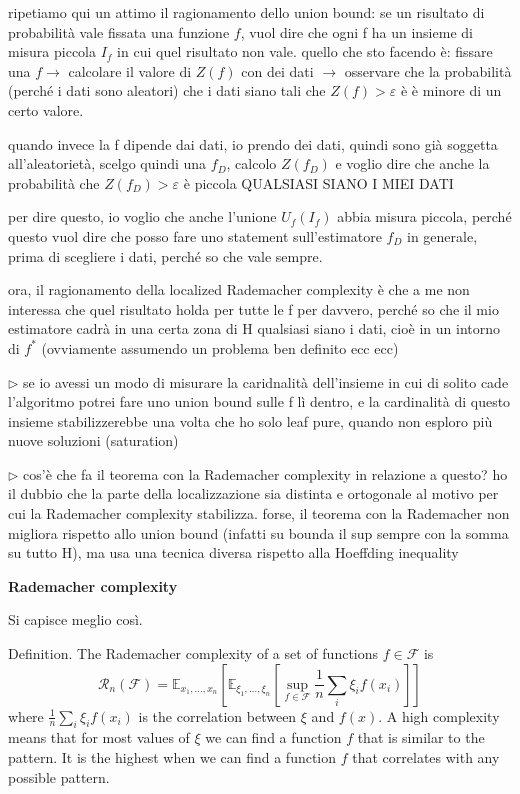 \documentclass{amsart}
\begin{document}
ripetiamo qui un attimo il ragionamento dello union bound: se un risultato di probabilità vale fissata una funzione $f$, vuol dire che ogni f ha un insieme di misura piccola $I_f$ in cui quel risultato non vale. quello che sto facendo è: fissare una $f \rightarrow$ calcolare il valore di $Z(f)$ con dei dati $\rightarrow$ osservare che la probabilità (perché i dati sono aleatori) che i dati siano tali che $Z(f) > \varepsilon$ è è minore di un certo valore. 


quando invece la f dipende dai dati, io prendo dei dati, quindi sono già soggetta all'aleatorietà, scelgo quindi una $f_D$, calcolo $Z(f_D)$ e voglio dire che anche la probabilità che $Z(f_D) > \varepsilon$ è piccola QUALSIASI SIANO I MIEI DATI

per dire questo, io voglio che anche l'unione $U_f(I_f)$ abbia misura piccola, perché questo vuol dire che posso fare uno statement sull'estimatore $f_D$ in generale, prima di scegliere i dati, perché so che vale sempre. 


ora, il ragionamento della localized Rademacher complexity è che a me non interessa che quel risultato holda per tutte le f per davvero, perché so che il mio estimatore cadrà in una certa zona di H qualsiasi siano i dati, cioè in un intorno di $f^*$ (ovviamente assumendo un problema ben definito ecc ecc)

$\triangleright$ se io avessi un modo di misurare la caridnalità dell'insieme in cui di solito cade l'algoritmo potrei fare uno union bound sulle f lì dentro, e la cardinalità di questo insieme stabilizzerebbe una volta che ho solo leaf pure, quando non esploro più nuove soluzioni (saturation)


$\triangleright$ cos'è che fa il teorema con la Rademacher complexity in relazione a questo? ho il dubbio che la parte della localizzazione sia distinta e ortogonale al motivo per cui la Rademacher complexity stabilizza. forse, il teorema con la Rademacher non migliora rispetto allo union bound (infatti su bounda il sup sempre con la somma su tutto H), ma usa una tecnica diversa rispetto alla Hoeffding inequality

\bigskip 

{\bf\Large Rademacher complexity}

Si capisce meglio così.

Definition. The Rademacher complexity of a set of functions $f\in\mathcal F$ is 
\[
\mathcal R_n(\mathcal F) = \mathbb E_{x_1,\ldots,x_n} \left[\mathbb E_{\xi_1,\ldots,\xi_n} \left[ \sup_{f\in \mathcal F} \frac{1}{n}\sum_i \xi_i f(x_i) \right]\right]
\]
where $\frac{1}{n}\sum_i \xi_i f(x_i)$ is the correlation between $\xi$ and $f(x)$. A high complexity means that for most values of $\xi$ we can find a function $f$ that is similar to the pattern. It is the highest when we can find a function $f$ that correlates with any possible pattern. 
\end{document}
